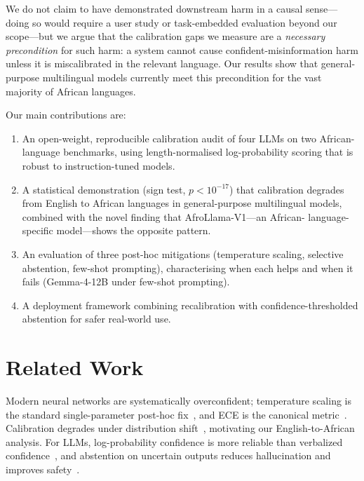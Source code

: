 \documentclass[11pt,a4paper]{article}
\begin{document}
We do not claim to have demonstrated downstream harm in a causal sense---doing so
would require a user study or task-embedded evaluation beyond our scope---but we
argue that the calibration gaps we measure are a \emph{necessary precondition}
for such harm: a system cannot cause confident-misinformation harm unless it is
miscalibrated in the relevant language. Our results show that general-purpose
multilingual models currently meet this precondition for the vast majority of
African languages.

Our main contributions are:
\begin{enumerate}[leftmargin=1.5em,itemsep=2pt]
  \item An open-weight, reproducible calibration audit of four LLMs on two
    African-language benchmarks, using length-normalised log-probability scoring
    that is robust to instruction-tuned models.
  \item A statistical demonstration (sign test, $p < 10^{-17}$) that calibration
    degrades from English to African languages in general-purpose multilingual
    models, combined with the novel finding that AfroLlama-V1---an African-
    language-specific model---shows the opposite pattern.
  \item An evaluation of three post-hoc mitigations (temperature scaling, selective
    abstention, few-shot prompting), characterising when each helps and when it
    fails (Gemma-4-12B under few-shot prompting).
  \item A deployment framework combining recalibration with confidence-thresholded
    abstention for safer real-world use.
\end{enumerate}

\section{Related Work}
\label{sec:related}

Modern neural networks are systematically overconfident; temperature scaling is
the standard single-parameter post-hoc fix~\citep{guo2017calibration}, and ECE
is the canonical metric~\citep{naeini2015obtaining}. Calibration degrades under
distribution shift~\citep{minderer2021revisiting}, motivating our English-to-African
analysis. For LLMs, log-probability confidence is more reliable than verbalized
confidence~\citep{xiong2024can}, and abstention on uncertain outputs reduces
hallucination and improves safety~\citep{tomani2024abstention,kuhn2023semantic}.
\end{document}
